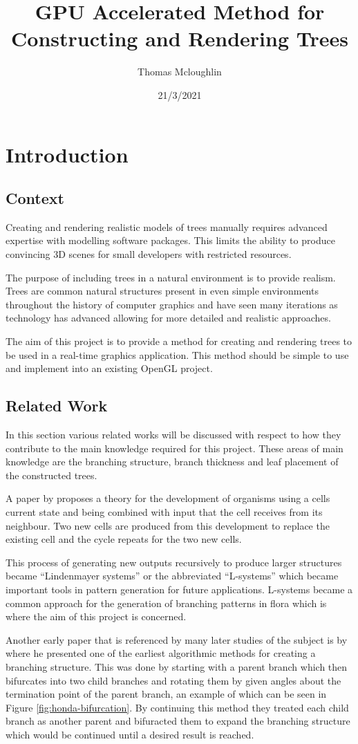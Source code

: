 \documentclass[final]{cmpreport}
\title{GPU Accelerated Method for Constructing and Rendering Trees}
\author{Thomas Mcloughlin}
\date{21/3/2021}
\begin{document}
\section{Introduction}

\subsection{Context}
Creating and rendering realistic models of trees manually requires advanced expertise 
with modelling software packages. This limits the ability to produce convincing 3D 
scenes for small developers with restricted resources.

The purpose of including trees in a natural environment is to provide realism. 
Trees are common natural structures present in even simple environments 
throughout the history of computer graphics and have seen many iterations as 
technology has advanced allowing for more detailed and realistic approaches.

The aim of this project is to provide a method for creating and rendering trees 
to be used in a real-time graphics application. This method should be simple to 
use and implement into an existing OpenGL project.

\subsection{Related Work}
In this section various related works will be discussed with respect to how they 
contribute to the main knowledge required for this project. These areas of main 
knowledge are the branching structure, branch thickness and leaf placement of the 
constructed trees.

A paper by \cite{lindenmayer1968mathematical} proposes a theory for the development 
of organisms using a cells current state and being combined with input that the cell 
receives from its neighbour. Two new cells are produced from this development to replace 
the existing cell and the cycle repeats for the two new cells. 

This process of generating new outputs recursively to produce larger structures became
``Lindenmayer systems'' or the abbreviated ``L-systems'' which became important tools 
in pattern generation for future applications. L-systems became a common approach for the 
generation of branching patterns in flora which is where the aim of this project is 
concerned.

Another early paper that is referenced by many later studies of the subject is by
\cite{honda1971description} where he presented one of the earliest algorithmic 
methods for creating a branching structure. This was done by starting with a parent 
branch which then bifurcates into two child branches and rotating them by given 
angles about the termination point of the parent branch, an example of which 
can be seen in Figure \ref{fig:honda-bifurcation}. By continuing this 
method they treated each child branch as another parent and bifuracted them to 
expand the branching structure which would be continued until a desired result is 
reached.
\end{document}
